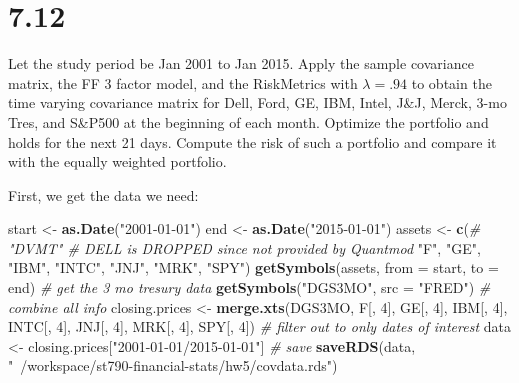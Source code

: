 \documentclass[11pt,]{article}
\newenvironment{Shaded}{\begin{snugshade}}{\end{snugshade}}
\newcommand{\CommentTok}[1]{\textcolor[rgb]{0.56,0.35,0.01}{\textit{#1}}}
\newcommand{\DataTypeTok}[1]{\textcolor[rgb]{0.13,0.29,0.53}{#1}}
\newcommand{\DecValTok}[1]{\textcolor[rgb]{0.00,0.00,0.81}{#1}}
\newcommand{\KeywordTok}[1]{\textcolor[rgb]{0.13,0.29,0.53}{\textbf{#1}}}
\newcommand{\NormalTok}[1]{#1}
\newcommand{\StringTok}[1]{\textcolor[rgb]{0.31,0.60,0.02}{#1}}
\begin{document}
\newpage

\hypertarget{section-3}{%
\section{7.12}\label{section-3}}

Let the study period be Jan 2001 to Jan 2015. Apply the sample
covariance matrix, the FF 3 factor model, and the RiskMetrics with
\(\lambda = .94\) to obtain the time varying covariance matrix for Dell,
Ford, GE, IBM, Intel, J\&J, Merck, 3-mo Tres, and S\&P500 at the
beginning of each month. Optimize the portfolio and holds for the next
21 days. Compute the risk of such a portfolio and compare it with the
equally weighted portfolio.

First, we get the data we need:

\begin{Shaded}
\begin{Highlighting}[]
\NormalTok{start <-}\StringTok{ }\KeywordTok{as.Date}\NormalTok{(}\StringTok{"2001-01-01"}\NormalTok{)}
\NormalTok{end <-}\StringTok{ }\KeywordTok{as.Date}\NormalTok{(}\StringTok{"2015-01-01"}\NormalTok{)}
\NormalTok{assets <-}\StringTok{ }\KeywordTok{c}\NormalTok{(}\CommentTok{# "DVMT" # DELL is DROPPED since not provided by Quantmod}
  \StringTok{"F"}\NormalTok{, }
  \StringTok{"GE"}\NormalTok{, }
  \StringTok{"IBM"}\NormalTok{, }
  \StringTok{"INTC"}\NormalTok{,}
  \StringTok{"JNJ"}\NormalTok{,}
  \StringTok{"MRK"}\NormalTok{,}
  \StringTok{"SPY"}\NormalTok{)}
\KeywordTok{getSymbols}\NormalTok{(assets, }\DataTypeTok{from =}\NormalTok{ start, }\DataTypeTok{to =}\NormalTok{ end) }
\CommentTok{# get the 3 mo tresury data }
\KeywordTok{getSymbols}\NormalTok{(}\StringTok{"DGS3MO"}\NormalTok{, }\DataTypeTok{src =} \StringTok{"FRED"}\NormalTok{)}
\CommentTok{# combine all info}
\NormalTok{closing.prices <-}\StringTok{ }\KeywordTok{merge.xts}\NormalTok{(DGS3MO, }
\NormalTok{                            F[, }\DecValTok{4}\NormalTok{], }
\NormalTok{                            GE[, }\DecValTok{4}\NormalTok{],}
\NormalTok{                            IBM[, }\DecValTok{4}\NormalTok{],}
\NormalTok{                            INTC[, }\DecValTok{4}\NormalTok{],}
\NormalTok{                            JNJ[, }\DecValTok{4}\NormalTok{], }
\NormalTok{                            MRK[, }\DecValTok{4}\NormalTok{], }
\NormalTok{                            SPY[, }\DecValTok{4}\NormalTok{])}
\CommentTok{# filter out to only dates of interest}
\NormalTok{data <-}\StringTok{ }\NormalTok{closing.prices[}\StringTok{"2001-01-01/2015-01-01"}\NormalTok{]}
\CommentTok{# save}
\KeywordTok{saveRDS}\NormalTok{(data, }\StringTok{"~/workspace/st790-financial-stats/hw5/covdata.rds"}\NormalTok{)}
\end{Highlighting}
\end{Shaded}
\end{document}
